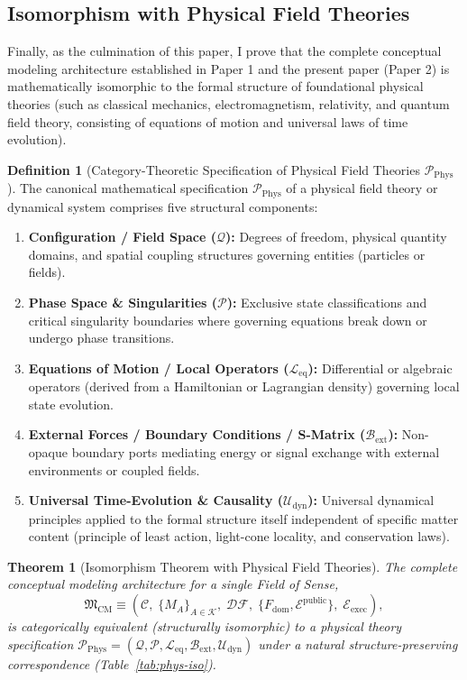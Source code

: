 \documentclass[11pt,a4paper]{article}
\theoremstyle{definition}
\newtheorem{definition}{Definition}[section]
\theoremstyle{plain}
\newtheorem{theorem}{Theorem}[section]
\theoremstyle{remark}
\newcommand{\DF}{\mathcal{DF}}
\begin{document}
\subsection{Isomorphism with Physical Field Theories}\label{sec:phys-iso}
Finally, as the culmination of this paper, I prove that the complete conceptual modeling architecture established in Paper 1 and the present paper (Paper 2) is mathematically isomorphic to the formal structure of foundational physical theories (such as classical mechanics, electromagnetism, relativity, and quantum field theory, consisting of equations of motion and universal laws of time evolution).

\begin{definition}[Category-Theoretic Specification of Physical Field Theories $\mathcal{P}_{\mathrm{Phys}}$]\label{def:phys-theory}
The canonical mathematical specification $\mathcal{P}_{\mathrm{Phys}}$ of a physical field theory or dynamical system comprises five structural components:
\begin{enumerate}
    \item \textbf{Configuration / Field Space ($\mathcal{Q}$):} Degrees of freedom, physical quantity domains, and spatial coupling structures governing entities (particles or fields).
    \item \textbf{Phase Space \& Singularities ($\mathcal{P}$):} Exclusive state classifications and critical singularity boundaries where governing equations break down or undergo phase transitions.
    \item \textbf{Equations of Motion / Local Operators ($\mathcal{L}_{\mathrm{eq}}$):} Differential or algebraic operators (derived from a Hamiltonian or Lagrangian density) governing local state evolution.
    \item \textbf{External Forces / Boundary Conditions / S-Matrix ($\mathcal{B}_{\mathrm{ext}}$):} Non-opaque boundary ports mediating energy or signal exchange with external environments or coupled fields.
    \item \textbf{Universal Time-Evolution \& Causality ($\mathcal{U}_{\mathrm{dyn}}$):} Universal dynamical principles applied to the formal structure itself independent of specific matter content (principle of least action, light-cone locality, and conservation laws).
\end{enumerate}
\end{definition}

\begin{theorem}[Isomorphism Theorem with Physical Field Theories]\label{thm:phys-iso}
The complete conceptual modeling architecture for a single Field of Sense,
\begin{equation}
\mathfrak{M}_{\mathrm{CM}} \equiv \left(\mathcal{C},\; \{M_A\}_{A \in \mathcal{K}},\; \DF,\; \{F_{\mathrm{dom}}, \mathcal{E}^{\mathrm{public}}\},\; \mathcal{E}_{\mathrm{exec}}\right),
\end{equation}
is categorically equivalent (structurally isomorphic) to a physical theory specification $\mathcal{P}_{\mathrm{Phys}} = (\mathcal{Q}, \mathcal{P}, \mathcal{L}_{\mathrm{eq}}, \mathcal{B}_{\mathrm{ext}}, \mathcal{U}_{\mathrm{dyn}})$ under a natural structure-preserving correspondence (Table~\ref{tab:phys-iso}).
\end{theorem}
\end{document}
